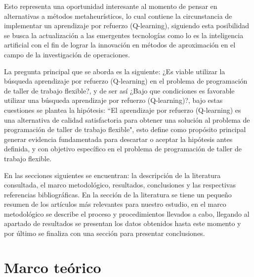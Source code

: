 \documentclass[letterpaper, 10 pt]{article}
\newcommand{\fjsp}{problema de programación de taller de trabajo flexible}
\begin{document}
Esto representa una oportunidad interesante al momento de pensar en alternativas a métodos metaheurísticos, lo cual contiene la circunstancia de implementar un aprendizaje por refuerzo (Q-learning), 
siguiendo esta posibilidad se busca la actualización a las emergentes tecnologías como lo es la inteligencia artificial con el fin de lograr la innovación en métodos de aproximación en el campo de la investigación de operaciones.

La pregunta principal que se aborda es la siguiente: ¿Es viable utilizar la búsqueda aprendizaje por refuerzo (Q-learning) en el \fjsp?, y de ser así ¿Bajo que condiciones es favorable utilizar una búsqueda aprendizaje por refuerzo (Q-learning)?, bajo estas cuestiones se plantea la hipótesis: ``El aprendizaje por refuerzo (Q-learning) es una alternativa de calidad satisfactoria para obtener una solución al \fjsp", esto define como propósito principal generar evidencia fundamentada para descartar o aceptar la hipótesis antes definida, y con objetivo específico en el problema de programación de taller de trabajo flexible. 

En las secciones siguientes se encuentran: la descripción de la literatura consultada, el marco metodológico, resultados, conclusiones y las respectivas referencias bibliográficas. En la sección de la literatura se tiene un pequeño resumen de los artículos más relevantes para nuestro estudio, en el marco metodológico se describe el proceso y procedimientos llevados a cabo, llegando al apartado de resultados se presentan los datos obtenidos hasta este momento y por último se finaliza con una sección para presentar conclusiones.


\section{Marco teórico}
%
\end{document}
